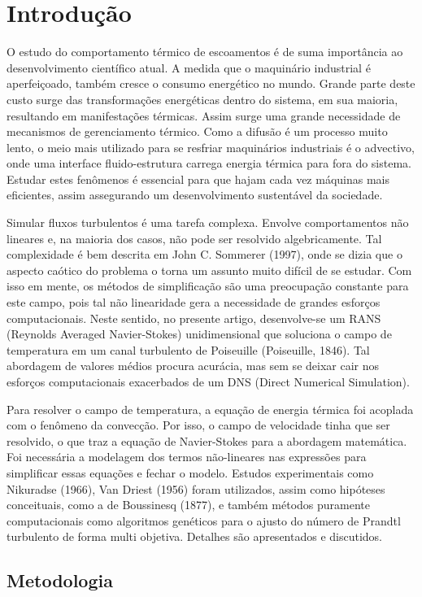 \chapter{Introdução}

\noindent 

 
 	O estudo do comportamento térmico de escoamentos é de suma importância ao desenvolvimento científico atual. A medida que o maquinário industrial é aperfeiçoado, também cresce o consumo energético no mundo. Grande parte deste custo surge das transformações energéticas dentro do sistema, em sua maioria, resultando em manifestações térmicas. Assim surge uma grande necessidade de mecanismos de gerenciamento térmico. Como a difusão é um processo muito lento, o meio mais utilizado para se resfriar maquinários industriais é o advectivo, onde uma interface fluido-estrutura carrega energia térmica para fora do sistema. Estudar estes fenômenos é essencial para que hajam cada vez máquinas mais eficientes, assim assegurando um desenvolvimento sustentável da sociedade. 
 	
	Simular fluxos turbulentos é uma tarefa complexa. Envolve comportamentos não lineares e, na maioria dos casos, não pode ser resolvido algebricamente. Tal complexidade é bem descrita em John C. Sommerer (1997), onde se dizia que o aspecto caótico do problema o torna um assunto muito difícil de se estudar. Com isso em mente, os métodos de simplificação são uma preocupação constante para este campo, pois tal não linearidade gera a necessidade de grandes esforços computacionais.
	Neste sentido, no presente artigo, desenvolve-se um RANS (Reynolds Averaged Navier-Stokes) unidimensional que soluciona o campo de temperatura em um canal turbulento de Poiseuille (Poiseuille, 1846). Tal abordagem de valores médios procura acurácia, mas sem se deixar cair nos esforços computacionais exacerbados de um DNS (Direct Numerical Simulation).
	
	Para resolver o campo de temperatura, a equação de energia térmica foi acoplada com o fenômeno da convecção. Por isso, o campo de velocidade tinha que ser resolvido, o que traz a equação de Navier-Stokes para a abordagem matemática. Foi necessária a modelagem dos termos não-lineares nas expressões para simplificar essas equações e fechar o modelo.
	Estudos experimentais como Nikuradse (1966), Van Driest (1956) foram utilizados, assim como hipóteses conceituais, como a de Boussinesq (1877), e também métodos puramente computacionais como algoritmos genéticos para o ajusto do número de Prandtl turbulento de forma multi objetiva. 
	Detalhes são apresentados e discutidos.
	
	
\newpage
	

 \section{Metodologia}


